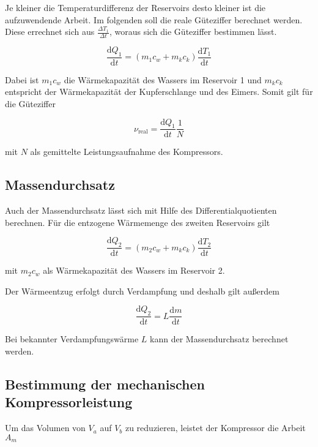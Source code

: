 Je kleiner die Temperaturdifferenz der Reservoirs desto kleiner ist die aufzuwendende Arbeit.
Im folgenden soll die reale Güteziffer berechnet werden. Diese errechnet sich aus $\frac{\Delta T_{1}}{\Delta t}$, woraus sich die Güteziffer bestimmen lässt.

\begin{equation}
\label{eqn:güteziffer1}
\frac{\mathrm{d}Q_{1}}{\mathrm{d}t} = (m_{1} c_w + m_k c_k)\frac {\mathrm{d}T_{1}}{\mathrm{d}t}
\end{equation}

Dabei ist $m_{1} c_w$ die Wärmekapazität des Wassers im Reservoir 1 und $m_k c_k$ entspricht der Wärmekapazität der Kupferschlange und des Eimers. Somit gilt für die Güteziffer

\begin{equation}
\label{eqn:güteziffer2}
ν_{\mathrm{real}} = \frac{\mathrm{d}Q_{1}}{\mathrm{d}t} \frac{1}{N}
\end{equation}

mit $N$ als gemittelte Leistungsaufnahme des Kompressors.

\subsection{Massendurchsatz}
Auch der Massendurchsatz lässt sich mit Hilfe des Differentialquotienten berechnen. Für die entzogene Wärmemenge des zweiten Reservoirs gilt

\begin{equation}
\label{eqn:durchsatz1}
\frac{\mathrm{d}Q_{2}}{\mathrm{d}t} = (m_2 c_w + m_kc_k)\frac{\mathrm{d}T_{2}}{\mathrm{d}t}
\end{equation}

mit $m_{2} c_w$ als Wärmekapazität des Wassers im Reservoir 2.

Der Wärmeentzug erfolgt durch Verdampfung und deshalb gilt außerdem

\begin{equation}
\label{eqn:durchsatz2}
\frac{\mathrm{d}Q_{2}}{\mathrm{d}t} = L\frac{\mathrm{d}m}{\mathrm{d}t}
\end{equation}

Bei bekannter Verdampfungswärme $L$ kann der Massendurchsatz berechnet werden.

\subsection{Bestimmung der mechanischen Kompressorleistung}
Um das Volumen von $V_a$ auf $V_b$ zu reduzieren, leistet der Kompressor die Arbeit $A_m$

